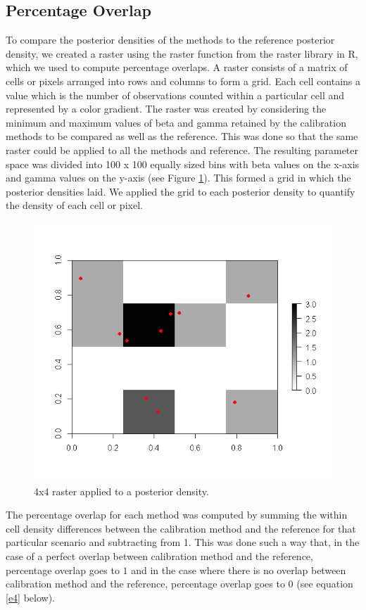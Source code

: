 \subsection{Percentage Overlap}
To compare the posterior densities of the methods to the reference posterior density, we created a raster using the raster function from the raster library in R, which we used to compute percentage overlaps. A raster consists of a matrix of cells or pixels arranged into rows and columns to form a grid. Each cell contains a value which is the number of observations counted within a particular cell and represented by a color gradient. The raster was created by considering the minimum and maximum values of beta and gamma retained by the calibration methods to be compared as well as the reference. This was done so that the same raster could be applied to all the methods and reference. The resulting parameter space was divided into 100 x 100 equally sized bins with beta values on the x-axis and gamma values on the y-axis (see Figure \ref{raster}). This formed a grid in which the posterior densities laid. We applied the grid to each posterior density to quantify the density of each cell or pixel.

\begin{figure}[h!!]
	\includegraphics[width=\linewidth]{raster.png}
	\caption{4x4 raster applied to a posterior density.}
	\label{raster}
\end{figure}


The percentage overlap for each method was computed by summing the within cell density differences between the calibration method and the reference for that particular scenario and subtracting from 1. This was done such a way that, in the case of a perfect overlap between calibration method and the reference, percentage overlap goes to $1$ and in the case where there is no overlap between calibration method and the reference, percentage overlap goes to $0$ (see equation \ref{e4} below).

